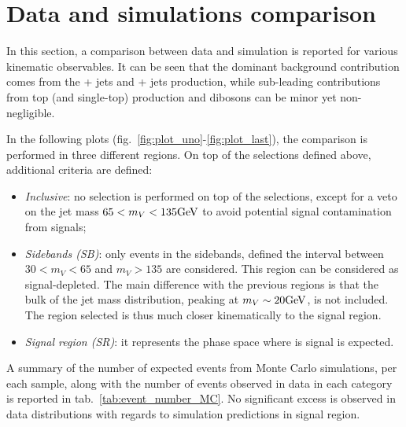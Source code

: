 \section{Data and simulations comparison}
\label{sec:datamc_comp}

In this section, a comparison between data and simulation is reported for various kinematic observables. It can be seen that the dominant background contribution comes from the \Z + jets and \W + jets production, while sub-leading contributions from top (\ttbar and single-top) production and dibosons can be minor yet non-negligible.

\noindent In the following plots (fig.~\ref{fig:plot_uno}-\ref{fig:plot_last}), the comparison is performed in three different regions. On top of the selections defined above, additional criteria are defined:
\begin{itemize}
  \item \textit{Inclusive}: no selection is performed on top of the selections, except for a veto on the jet mass $65 < m_V < 135\text{GeV}$ to avoid potential signal contamination from \VZ signals;
  \item \textit{Sidebands (SB)}: only events in the sidebands, defined the interval between $30 < m_V < 65$ \GeV and $m_V > 135$ \GeV are considered. This region can be considered as signal-depleted. The main difference with the previous regions is that the bulk of the jet mass distribution, peaking at $m_V \sim 20\text{GeV}$, is not included. The region selected is thus much closer kinematically to the signal region.
  \item \textit{Signal region (SR)}: it represents the phase space where is signal is expected. %
\end{itemize}

\noindent A summary of the number of expected events from Monte Carlo simulations, per each sample, along with the number of events observed in data in each category is reported in tab.~\ref{tab:event_number_MC}. No significant excess is observed in data distributions with regards to simulation predictions in signal region.

